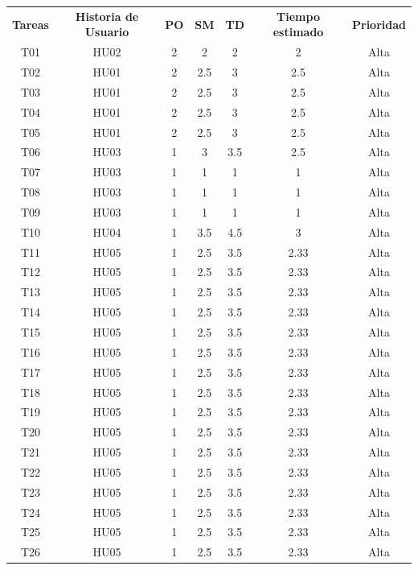 \begin{table}[H]
	\begin{center}
		\begin{longtable}{| c | c | c | c | c | c | c |}
			\hline
			
			\textbf{Tareas} &\textbf{Historia de Usuario} & \textbf{PO} & \textbf{SM} & \textbf{TD} & \textbf{Tiempo estimado} & \textbf{Prioridad} \\
			T01 & HU02 & 2 & 2 & 2 & 2 & Alta \\
			T02 & HU01 & 2 & 2.5 & 3 & 2.5 & Alta \\
			T03 & HU01 & 2 & 2.5 & 3 & 2.5 & Alta \\
			T04 & HU01 & 2 & 2.5 & 3 & 2.5 & Alta \\
			T05 & HU01 & 2 & 2.5 & 3 & 2.5 & Alta \\
			T06 & HU03 & 1 & 3 & 3.5 & 2.5 & Alta \\
			T07 & HU03 & 1 & 1 & 1 & 1 & Alta \\
			T08 & HU03 & 1 & 1 & 1 & 1 & Alta \\
			T09 & HU03 & 1 & 1 & 1 & 1 & Alta \\
			T10 & HU04 & 1 & 3.5 & 4.5 & 3 & Alta \\	
			T11 & HU05 & 1 & 2.5 & 3.5 & 2.33 & Alta \\
			T12 & HU05 & 1 & 2.5 & 3.5 & 2.33 & Alta \\
			T13 & HU05 & 1 & 2.5 & 3.5 & 2.33 & Alta \\
			T14 & HU05 & 1 & 2.5 & 3.5 & 2.33 & Alta \\
			T15 & HU05 & 1 & 2.5 & 3.5 & 2.33 & Alta \\
			T16 & HU05 & 1 & 2.5 & 3.5 & 2.33 & Alta \\
			T17 & HU05 & 1 & 2.5 & 3.5 & 2.33 & Alta \\
			T18 & HU05 & 1 & 2.5 & 3.5 & 2.33 & Alta \\
			T19 & HU05 & 1 & 2.5 & 3.5 & 2.33 & Alta \\
			T20 & HU05 & 1 & 2.5 & 3.5 & 2.33 & Alta \\
			T21 & HU05 & 1 & 2.5 & 3.5 & 2.33 & Alta \\
			T22 & HU05 & 1 & 2.5 & 3.5 & 2.33 & Alta \\
			T23 & HU05 & 1 & 2.5 & 3.5 & 2.33 & Alta \\
			T24 & HU05 & 1 & 2.5 & 3.5 & 2.33 & Alta \\
			T25 & HU05 & 1 & 2.5 & 3.5 & 2.33 & Alta \\
			T26 & HU05 & 1 & 2.5 & 3.5 & 2.33 & Alta \\

\end{longtable}
\end{center}
\end{table}
